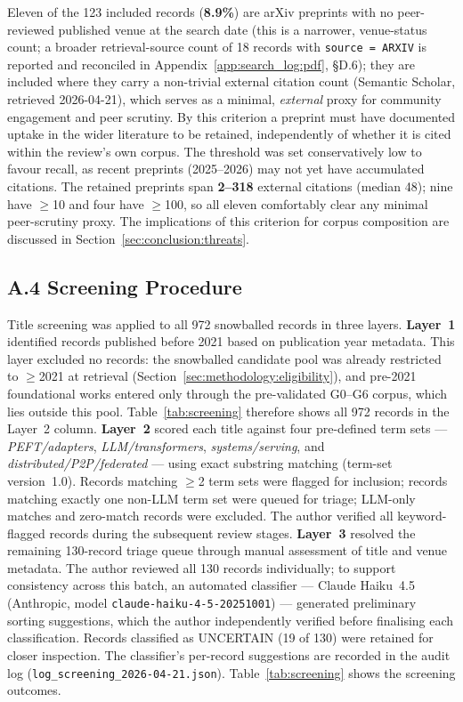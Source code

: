 Eleven of the 123 included records (\textbf{8.9\%}) are arXiv preprints with
no peer-reviewed published venue at the search date (this is a narrower,
venue-status count; a broader retrieval-source count of 18 records with
\texttt{source = ARXIV} is reported and reconciled in
Appendix~\ref{app:search_log:pdf}, \S D.6); they are included where
they carry a non-trivial external citation count (Semantic Scholar, retrieved
2026-04-21), which serves as a minimal, \emph{external} proxy for
community engagement and peer scrutiny. By this criterion a preprint must have
documented uptake in the wider literature to be retained, independently of
whether it is cited within the review's own corpus. The threshold was set
conservatively low to favour recall, as recent preprints (2025--2026) may not
yet have accumulated citations. The retained preprints span \textbf{2--318}
external citations (median 48); nine have $\geq$10 and four have $\geq$100,
so all eleven comfortably clear any minimal peer-scrutiny proxy. The
implications of this criterion for corpus composition are discussed in
Section~\ref{sec:conclusion:threats}.

\subsection*{A.4 Screening Procedure}

Title screening was applied to all 972 snowballed records in three layers.
\textbf{Layer~1} identified records published before 2021 based on publication
year metadata. This layer excluded no records: the snowballed candidate pool
was already restricted to $\geq$2021 at retrieval
(Section~\ref{sec:methodology:eligibility}), and pre-2021 foundational works
entered only through the pre-validated G0--G6 corpus, which lies outside this
pool. Table~\ref{tab:screening} therefore shows all 972 records in the
Layer~2 column. \textbf{Layer~2} scored each title against four pre-defined
term sets --- \textit{PEFT/adapters}, \textit{LLM/transformers},
\textit{systems/serving}, and \textit{distributed/P2P/federated} --- using
exact substring matching (term-set version~1.0). Records matching $\geq$2
term sets were flagged for inclusion; records matching exactly one non-LLM
term set were queued for triage; LLM-only matches and zero-match records were
excluded. The author verified all keyword-flagged records during the
subsequent review stages. \textbf{Layer~3} resolved the remaining 130-record
triage queue through manual assessment of title and venue metadata. The author
reviewed all 130 records individually; to support consistency across this
batch, an automated classifier --- Claude Haiku~4.5 (Anthropic, model
\texttt{claude-haiku-4-5-20251001}) --- generated preliminary sorting
suggestions, which the author independently verified before finalising each
classification. Records classified as UNCERTAIN (19 of 130) were retained for
closer inspection. The classifier's per-record suggestions are recorded in the
audit log (\texttt{log\_screening\_2026-04-21.json}). Table~\ref{tab:screening}
shows the screening outcomes.


